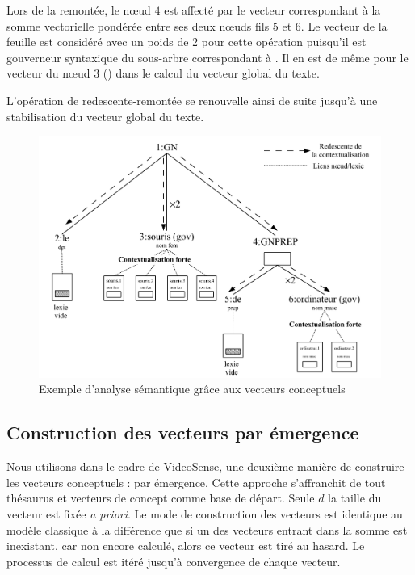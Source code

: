 Lors de la remontée, le n\oe ud $4$ est affecté par le vecteur
correspondant à la somme vectorielle pondérée entre ses deux n\oe uds
fils $5$ et $6$. Le vecteur de la feuille est considéré avec un poids
de 2 pour cette opération puisqu'il est gouverneur syntaxique du
sous-arbre correspondant à . Il en est de même
pour le vecteur du n\oe ud $3$ () dans le calcul du
vecteur global du texte.

L'opération de redescente-remontée se renouvelle ainsi de suite
jusqu'à une stabilisation du vecteur global du texte.


\begin{figure}[h]
  
  \centering\includegraphics[width=16cm]{2_Etat-art/img/an-sem-VC-souris-de-lordi}
\caption{Exemple d'analyse sémantique grâce aux vecteurs conceptuels}
\label{fig:an-sem-VC}
\end{figure}

\subsection{Construction des vecteurs par émergence}
\label{sec:emergence}

Nous utilisons dans le cadre de VideoSense, une deuxième manière de construire les vecteurs conceptuels : par émergence. Cette approche s'affranchit de tout thésaurus et vecteurs de
concept comme base de départ. Seule $d$ %
la taille du vecteur est fixée \emph{a priori}. Le mode de
construction des vecteurs est identique au modèle classique à la
différence que si un des vecteurs entrant dans la somme est
inexistant, car non encore calculé, alors ce vecteur est tiré au
hasard. Le processus de calcul est itéré jusqu'à convergence de chaque
vecteur.

